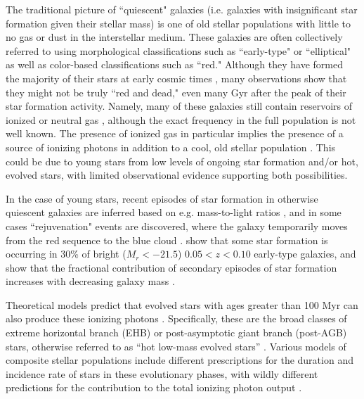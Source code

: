 \documentclass[twocolumn,natbib,iop,hyperref]{aastex62}
\newcommand{\msol}{M$_{\odot}$}
\begin{document}
The traditional picture of ``quiescent" galaxies (i.e. galaxies with insignificant star formation given their stellar mass) is one of old stellar populations with little to no gas or dust in the interstellar medium.  These galaxies are often collectively referred to using morphological classifications such as ``early-type" or ``elliptical" as well as color-based classifications such as ``red."  Although they have formed the majority of their stars at early cosmic times \cite[$z>1$;][]{2005ApJ...633..174T}, many observations show that  they might not be truly ``red and dead," even many Gyr after the peak of their star formation activity.  Namely, many of these galaxies still contain reservoirs of ionized or neutral gas \cite[e.g.][]{1975ApJ...202....7G,1980AA....87..152H,2006MNRAS.366.1151S,2010AA...519A..40A,2012MNRAS.422.1835S,2016MNRAS.461.3111B,2018ApJ...860..103S}, although the exact frequency in the full population is not well known.  The presence of ionized gas in particular implies the presence of a source of ionizing photons in addition to a cool, old stellar population \citep{1969PASP...81..475C}.  This could be due to young stars from low levels of ongoing star formation and/or hot, evolved stars, with limited observational evidence supporting both possibilities.

In the case of young stars, recent episodes of star formation in otherwise quiescent galaxies are inferred based on e.g. mass-to-light ratios \citep{2002ApJ...564L..13T}, and in some cases ``rejuvenation" events are discovered, where the galaxy temporarily moves from the red sequence to the blue cloud \cite[e.g. in 16\% of quiescent galaxies at $z\approx0.8$;][see also \citeauthor{2021ApJ...907L...8A} \citeyear{2021ApJ...907L...8A}]{2019ApJ...877...48C}.  \citet{2007ApJS..173..512S} show that some star formation is occurring in 30\% of bright ($M_r < -21.5$) $0.05 < z < 0.10$ early-type galaxies, and \citet{2005ApJ...633..174T} show that the fractional contribution of secondary episodes of star formation increases with decreasing galaxy mass \cite[from $<$1\% for masses above 10$^{11.5}$ \msol\ to 20$-$40\% below 10$^{11}$ \msol; see also][]{2007ApJS..173..619K,2010MNRAS.404.1775T,2020NatAs...4..252S}.  

Theoretical models predict that evolved stars with ages greater than 100 Myr can also produce these ionizing photons \citep{1990ApJ...364...35G,1994AA...292...13B}.  Specifically, these are the broad classes of extreme horizontal branch (EHB) or post-asymptotic giant branch (post-AGB) stars, otherwise referred to as ``hot low-mass evolved stars'' \citep{2011MNRAS.413.1687C}.  Various models of composite stellar populations include different prescriptions for the duration and incidence rate of stars in these evolutionary phases, with wildly different predictions for the contribution to the total ionizing photon output \cite[e.g.][]{2006ApJ...652...85M,2010ApJ...722L..64K}. 
\end{document}
